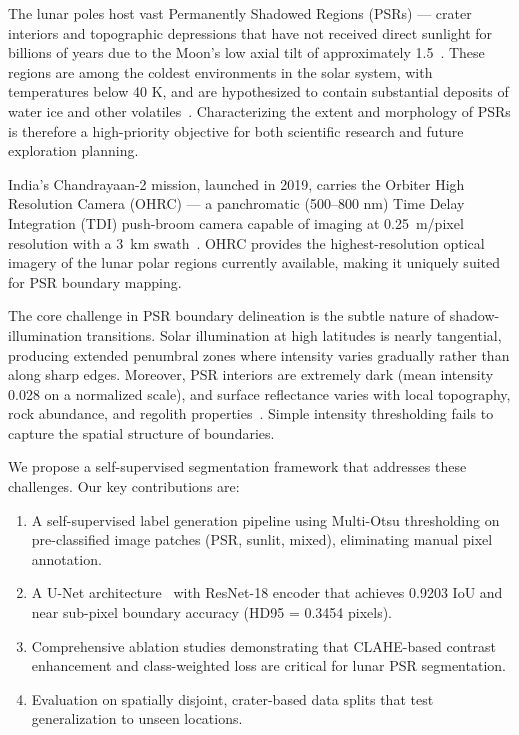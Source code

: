 \documentclass[journal]{IEEEtran}
\begin{document}
The lunar poles host vast Permanently Shadowed Regions (PSRs) --- crater interiors and topographic depressions that have not received direct sunlight for billions of years due to the Moon's low axial tilt of approximately 1.5\textdegree~\cite{Paige2010_Diviner}. These regions are among the coldest environments in the solar system, with temperatures below 40 K, and are hypothesized to contain substantial deposits of water ice and other volatiles~\cite{Colaprete2010_LCROSS, Li2018_WaterIce}. Characterizing the extent and morphology of PSRs is therefore a high-priority objective for both scientific research and future exploration planning.

India's Chandrayaan-2 mission, launched in 2019, carries the Orbiter High Resolution Camera (OHRC) --- a panchromatic (500--800 nm) Time Delay Integration (TDI) push-broom camera capable of imaging at 0.25~m/pixel resolution with a 3~km swath~\cite{Chowdhury2020_OHRC}. OHRC provides the highest-resolution optical imagery of the lunar polar regions currently available, making it uniquely suited for PSR boundary mapping.

The core challenge in PSR boundary delineation is the subtle nature of shadow-illumination transitions. Solar illumination at high latitudes is nearly tangential, producing extended penumbral zones where intensity varies gradually rather than along sharp edges. Moreover, PSR interiors are extremely dark (mean intensity 0.028 on a normalized scale), and surface reflectance varies with local topography, rock abundance, and regolith properties~\cite{Dagar2023_Cabeus}. Simple intensity thresholding fails to capture the spatial structure of boundaries.

We propose a self-supervised segmentation framework that addresses these challenges. Our key contributions are:
\begin{enumerate}
    \item A self-supervised label generation pipeline using Multi-Otsu thresholding on pre-classified image patches (PSR, sunlit, mixed), eliminating manual pixel annotation.
    \item A U-Net architecture~\cite{Ronneberger2015_UNet} with ResNet-18 encoder that achieves 0.9203 IoU and near sub-pixel boundary accuracy (HD95 = 0.3454 pixels).
    \item Comprehensive ablation studies demonstrating that CLAHE-based contrast enhancement and class-weighted loss are critical for lunar PSR segmentation.
    \item Evaluation on spatially disjoint, crater-based data splits that test generalization to unseen locations.
\end{enumerate}
\end{document}
